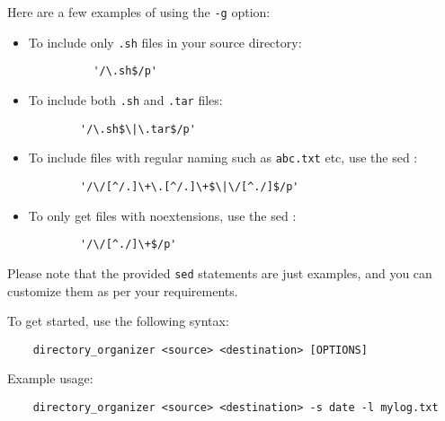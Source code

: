 \documentclass[12pt]{article}
\begin{document}
    Here are a few examples of using the \texttt{-g} option:
    \begin{itemize}
      \item To include only \texttt{.sh} files in your source directory:
      \begin{verbatim}
          '/\.sh$/p'
      \end{verbatim}
      \item To include both \texttt{.sh} and \texttt{.tar} files: 
      \begin{verbatim}
        '/\.sh$\|\.tar$/p'    
      \end{verbatim}
      \item To include files with regular naming such as \texttt{abc.txt} etc, use the sed : 
      \begin{verbatim}
        '/\/[^/.]\+\.[^/.]\+$\|\/[^./]$/p'  
      \end{verbatim}
      \item To only get files with noextensions, use the sed :  
      \begin{verbatim}
        '/\/[^./]\+$/p'    
      \end{verbatim}
    \end{itemize}
    
    Please note that the provided \texttt{sed} statements are just examples, and you can customize them as per your requirements.
    
    To get started, use the following syntax:
    \begin{verbatim}
    directory_organizer <source> <destination> [OPTIONS]
    \end{verbatim}
    Example usage:
    \begin{verbatim}
    directory_organizer <source> <destination> -s date -l mylog.txt
    \end{verbatim}
\end{document}
